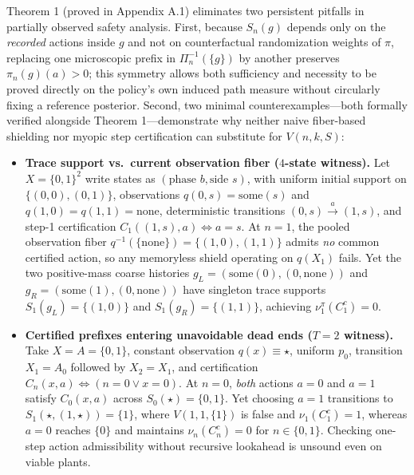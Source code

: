 \documentclass[11pt,a4paper]{article}
\newcounter{none}
\providecommand{\tightlist}{\setlength{\itemsep}{2pt}\setlength{\parskip}{0pt}}
\begin{document}
Theorem 1 (proved in Appendix A.1) eliminates two persistent pitfalls in
partially observed safety analysis. First, because \(S_n(g)\) depends
only on the \emph{recorded} actions inside \(g\) and not on
counterfactual randomization weights of \(\pi\), replacing one
microscopic prefix in \(\Pi_n^{-1}(\{g\})\) by another preserves
\(\pi_n(g)(a) > 0\); this symmetry allows both sufficiency and necessity
to be proved directly on the policy's own induced path measure without
circularly fixing a reference posterior. Second, two minimal
counterexamples---both formally verified alongside Theorem
1---demonstrate why neither naive fiber-based shielding nor myopic step
certification can substitute for \(V(n, k, S)\):

\begin{itemize}
\tightlist
\item
  \textbf{Trace support vs.~current observation fiber (\(4\)-state
  witness).} Let \(X = \{0,1\}^2\) write states as
  \((\text{phase } b, \text{side } s)\), with uniform initial support on
  \(\{(0,0), (0,1)\}\), observations \(q(0,s) = \mathrm{some}(s)\) and
  \(q(1,0) = q(1,1) = \mathrm{none}\), deterministic transitions
  \((0,s) \xrightarrow{a} (1,s)\), and step-1 certification
  \(C_1((1,s), a) \iff a = s\). At \(n=1\), the pooled observation fiber
  \(q^{-1}(\{\mathrm{none}\}) = \{(1,0), (1,1)\}\) admits \emph{no}
  common certified action, so any memoryless shield operating on
  \(q(X_1)\) fails. Yet the two positive-mass coarse histories
  \(g_L = (\mathrm{some}(0), (0, \mathrm{none}))\) and
  \(g_R = (\mathrm{some}(1), (0, \mathrm{none}))\) have singleton trace
  supports \(S_1(g_L) = \{(1,0)\}\) and \(S_1(g_R) = \{(1,1)\}\),
  achieving \(\nu_1^\pi(C_1^c) = 0\).
\item
  \textbf{Certified prefixes entering unavoidable dead ends (\(T=2\)
  witness).} Take \(X = A = \{0,1\}\), constant observation
  \(q(x) \equiv \star\), uniform \(p_0\), transition \(X_1 = A_0\)
  followed by \(X_2 = X_1\), and certification
  \(C_n(x,a) \iff (n = 0 \lor x = 0)\). At \(n = 0\), \emph{both}
  actions \(a = 0\) and \(a = 1\) satisfy \(C_0(x,a)\) across
  \(S_0(\star) = \{0,1\}\). Yet choosing \(a = 1\) transitions to
  \(S_1(\star, (1, \star)) = \{1\}\), where \(V(1, 1, \{1\})\) is false
  and \(\nu_1(C_1^c) = 1\), whereas \(a = 0\) reaches \(\{0\}\) and
  maintains \(\nu_n(C_n^c) = 0\) for \(n \in \{0,1\}\). Checking
  one-step action admissibility without recursive lookahead is unsound
  even on viable plants.
\end{itemize}
\end{document}
